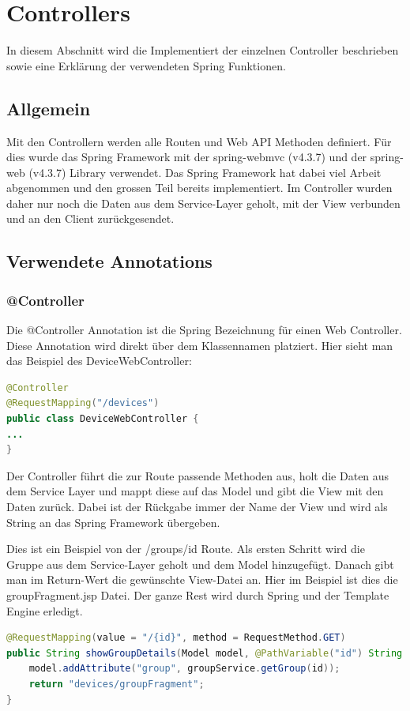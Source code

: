 \newpage

\section{Controllers}
In diesem Abschnitt wird die Implementiert der einzelnen Controller beschrieben sowie eine Erklärung der verwendeten Spring Funktionen.

\subsection{Allgemein}
Mit den Controllern werden alle Routen und Web API Methoden definiert. Für dies wurde das Spring Framework mit der spring-webmvc (v4.3.7) und der spring-web (v4.3.7) Library verwendet. Das Spring Framework hat dabei viel Arbeit abgenommen und den grossen Teil bereits implementiert. Im Controller wurden daher nur noch die Daten aus dem Service-Layer geholt, mit der View verbunden und an den Client zurückgesendet.

\subsection{Verwendete Annotations}
\subsubsection{@Controller}
Die @Controller Annotation ist die Spring Bezeichnung für einen Web Controller. Diese Annotation wird direkt über dem Klassennamen platziert. Hier sieht man das Beispiel des DeviceWebController:
\begin{lstlisting}[language=java]
@Controller
@RequestMapping("/devices")
public class DeviceWebController {
...
}
\end{lstlisting}

Der Controller führt die zur Route passende Methoden aus, holt die Daten aus dem Service Layer und mappt diese auf das Model und gibt die View mit den Daten zurück. Dabei ist der Rückgabe immer der Name der View und wird als String an das Spring Framework übergeben.

Dies ist ein Beispiel von der /groups/id Route. Als ersten Schritt wird die Gruppe aus dem Service-Layer geholt und dem Model hinzugefügt. Danach gibt man im Return-Wert die gewünschte View-Datei an. Hier im Beispiel ist dies die groupFragment.jsp Datei. Der ganze Rest wird durch Spring und der Template Engine erledigt.
\begin{lstlisting}[language=java]
@RequestMapping(value = "/{id}", method = RequestMethod.GET)
public String showGroupDetails(Model model, @PathVariable("id") String id) {
	model.addAttribute("group", groupService.getGroup(id));
	return "devices/groupFragment";
}
\end{lstlisting}
